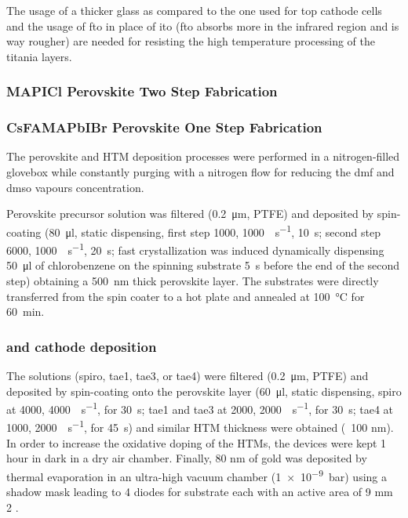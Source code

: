  			The usage of a thicker glass as compared to the one used for top cathode cells and the usage of \gls{fto} in place of \gls{ito} (\gls{fto} absorbs more in the infrared region and is way rougher) are needed for resisting the high temperature processing of the titania layers.
 			
		\subsubsection{MAPICl Perovskite Two Step Fabrication}
		
		\subsubsection{CsFAMAPbIBr Perovskite One Step Fabrication}
		
			The perovskite and HTM deposition processes were performed in a nitrogen-filled glovebox
			while constantly purging with a nitrogen flow for reducing the \gls{dmf} and \gls{dmso} vapours concentration.
			
			Perovskite precursor solution was filtered (\SI{0.2}{\um}, PTFE)
			and deposited by spin-coating (\SI{80}{\ul}, static dispensing, first step \SI{1000}{\rpm}, \SI{1000}{\rpm\per\s}, \SI{10}{\s};
			second step \SI{6000}{\rpm}, \SI{1000}{\rpm\per\s}, \SI{20}{\s}; fast crystallization was induced dynamically
			dispensing \SI{50}{\ul} of chlorobenzene on the spinning substrate \SI{5}{\s} before the end of the second
			step) obtaining a \SI{500}{\nm} thick perovskite layer. The substrates were directly transferred from
			the spin coater to a hot plate and annealed at \SI{100}{\celsius} for \SI{60}{\minute}. 
		
		\subsubsection{ and cathode deposition}
		
		The  solutions (\gls{spiro}, \gls{tae1}, \gls{tae3}, or \gls{tae4}) were filtered (\SI{0.2}{\um}, PTFE) and deposited by spin-coating
		onto the perovskite layer (\SI{60}{\ul}, static dispensing, \gls{spiro} at \SI{4000}{\rpm}, \SI{4000}{\rpm\per\s},
		for \SI{30}{\s}; \gls{tae1} and \gls{tae3} at \SI{2000}{\rpm}, \SI{2000}{\rpm\per\s}, for \SI{30}{\s}; \gls{tae4} at \SI{1000}{\rpm}, \SI{2000}{\rpm\per\s},
		for \SI{45}{\s}) and similar HTM thickness were obtained (~100 nm). In order to increase the
		oxidative doping of the HTMs, the devices were kept 1 hour in dark in a dry air chamber.
		Finally, 80 nm of gold was deposited by thermal evaporation in an ultra-high vacuum chamber
		(\SI{1e-9}{\bar}) using a shadow mask leading to 4 diodes for substrate each with an active area of
		9 mm 2 .

